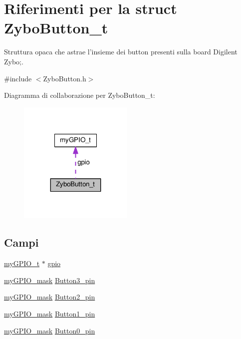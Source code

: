 \hypertarget{struct_zybo_button__t}{\section{Riferimenti per la struct Zybo\+Button\+\_\+t}
\label{struct_zybo_button__t}
}


Struttura opaca che astrae l'insieme dei button presenti sulla board Digilent Zybo;.  




{\ttfamily \#include $<$Zybo\+Button.\+h$>$}



Diagramma di collaborazione per Zybo\+Button\+\_\+t\+:\nopagebreak
\begin{figure}[H]
\begin{center}
\leavevmode
\includegraphics[width=155pt]{struct_zybo_button__t__coll__graph}
\end{center}
\end{figure}
\subsection*{Campi}
\begin{DoxyCompactItemize}
\item 
\hyperlink{structmy_g_p_i_o__t}{my\+G\+P\+I\+O\+\_\+t} $\ast$ \hyperlink{struct_zybo_button__t_ac37ddc7c58d246d233dfb38037020184}{gpio}
\item 
\hyperlink{group__my_g_p_i_o_ga402a0d20afc0cb7c25554b8b023f4253}{my\+G\+P\+I\+O\+\_\+mask} \hyperlink{struct_zybo_button__t_ad462a15a55883fd4c86d2be9e11968a7}{Button3\+\_\+pin}
\item 
\hyperlink{group__my_g_p_i_o_ga402a0d20afc0cb7c25554b8b023f4253}{my\+G\+P\+I\+O\+\_\+mask} \hyperlink{struct_zybo_button__t_a3b4fe634c2d98ce55fdef526c2d230d1}{Button2\+\_\+pin}
\item 
\hyperlink{group__my_g_p_i_o_ga402a0d20afc0cb7c25554b8b023f4253}{my\+G\+P\+I\+O\+\_\+mask} \hyperlink{struct_zybo_button__t_a6cb60bb285e32e29c51c15e85206aaeb}{Button1\+\_\+pin}
\item 
\hyperlink{group__my_g_p_i_o_ga402a0d20afc0cb7c25554b8b023f4253}{my\+G\+P\+I\+O\+\_\+mask} \hyperlink{struct_zybo_button__t_af7d7d5a9c9fc174e8f4ee4c762c2abee}{Button0\+\_\+pin}
\end{DoxyCompactItemize}


